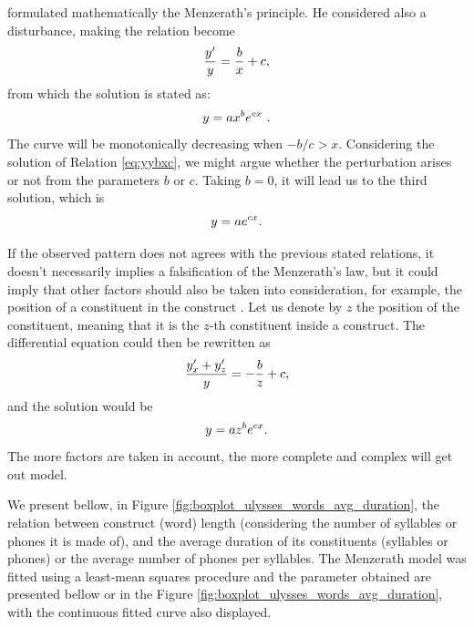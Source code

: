 \cite{altmann1980}
formulated mathematically the Menzerath's principle.
He considered also a disturbance, making the relation become
\begin{equation}
\frac{y'}{y} = \frac{b}{x} + c \textmd{,}
\label{eq:yybxc}
\end{equation} 
from which the solution is stated as:
\begin{equation}
y = a x^b  e^{c x} \textmd{ .}
\end{equation}
The curve will be monotonically decreasing when $-b/c > x$.
Considering the solution of Relation \ref{eq:yybxc}, we might argue whether
the perturbation arises or not from the parameters $b$ or $c$. Taking 
$b=0$, it will lead us to the third solution, which is
\begin{equation}
y = a e^{cx} \textmd{.}
\end{equation}

If the observed pattern does not agrees with the previous stated relations,
it doesn't necessarily implies a falsification of the Menzerath's law, but 
it could imply that other factors should also be taken into consideration,
for example, the position of a constituent in the construct \cite{altmann1989}.
Let us denote by $z$ the position of the constituent, meaning that it is
the $z$-th constituent inside a construct. The differential equation could 
then be rewritten as
\begin{equation}
\frac{y_x' + y_z'}{y} = - \frac{b}{z} + c \textmd{,}
\end{equation}
and the solution would be
\begin{equation}
y = az^b e^{cx} \textmd{.}
\end{equation}
The more factors are taken in account, the more complete and complex will get out
model.



We present bellow, in Figure \ref{fig:boxplot_ulysses_words_avg_duration}, the relation
between construct (word) length (considering the number of syllables or phones it is made of), and
the average duration of its constituents (syllables or phones) or the average number of phones per syllables.
The Menzerath model was fitted using a least-mean squares procedure and the parameter obtained are 
presented bellow or in the Figure \ref{fig:boxplot_ulysses_words_avg_duration}, 
with the continuous fitted curve also displayed.


